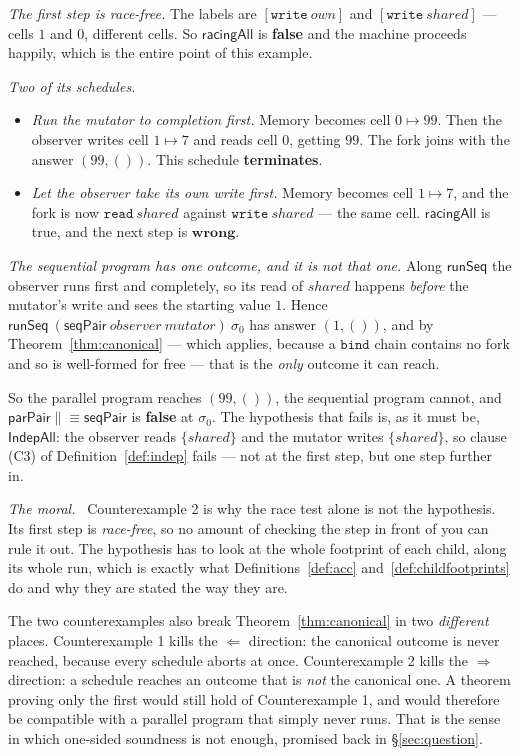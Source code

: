 \documentclass[11pt,a4paper]{article}
\theoremstyle{definition}
\theoremstyle{plain}
\theoremstyle{remark}
\newenvironment{moral}{\par\medskip\noindent\textit{The moral.}\ \ignorespaces}{\par\medskip}
\newcommand{\st}{\sigma}
\newcommand{\runSeq}{\mathsf{runSeq}}
\newcommand{\wrong}{\mathbf{wrong}}
\begin{document}
\emph{The first step is race-free.} The labels are $[\texttt{write}\ \mathit{own}]$ and
$[\texttt{write}\ \mathit{shared}]$ --- cells $1$ and $0$, different cells. So
$\mathsf{racingAll}$ is \textbf{false} and the machine proceeds happily, which is the entire
point of this example.

\emph{Two of its schedules.}
\begin{itemize}[leftmargin=1.6em,itemsep=1pt]
\item \emph{Run the mutator to completion first.} Memory becomes cell $0 \mapsto 99$. Then the
      observer writes cell $1 \mapsto 7$ and reads cell $0$, getting $99$. The fork joins with
      the answer $(99, ())$. This schedule \textbf{terminates}.
\item \emph{Let the observer take its own write first.} Memory becomes cell $1 \mapsto 7$, and
      the fork is now $\texttt{read}\ \mathit{shared}$ against
      $\texttt{write}\ \mathit{shared}$ --- the same cell. $\mathsf{racingAll}$ is true, and
      the next step is $\wrong$.
\end{itemize}

\emph{The sequential program has one outcome, and it is not that one.} Along $\runSeq$ the
observer runs first and completely, so its read of $\mathit{shared}$ happens \emph{before} the
mutator's write and sees the starting value $1$. Hence
$\runSeq\ (\mathsf{seqPair}\ \mathit{observer}\ \mathit{mutator})\ \st_0$ has answer
$(1, ())$, and by Theorem~\ref{thm:canonical} --- which applies, because a $\texttt{bind}$
chain contains no fork and so is well-formed for free --- that is the \emph{only} outcome it
can reach.

So the parallel program reaches $(99,())$, the sequential program cannot, and
$\mathsf{parPair} \mathrel{\|\!\equiv} \mathsf{seqPair}$ is \textbf{false} at $\st_0$. The
hypothesis that fails is, as it must be, $\mathsf{IndepAll}$: the observer reads
$\{\mathit{shared}\}$ and the mutator writes $\{\mathit{shared}\}$, so clause (C3) of
Definition~\ref{def:indep} fails --- not at the first step, but one step further in.

\begin{moral}
Counterexample 2 is why the race test alone is not the hypothesis. Its first step is
\emph{race-free}, so no amount of checking the step in front of you can rule it out. The
hypothesis has to look at the whole footprint of each child, along its whole run, which is
exactly what Definitions~\ref{def:acc} and~\ref{def:childfootprints} do and why they are
stated the way they are.

The two counterexamples also break Theorem~\ref{thm:canonical} in two \emph{different} places.
Counterexample 1 kills the $\Longleftarrow$ direction: the canonical outcome is never reached,
because every schedule aborts at once. Counterexample 2 kills the $\Longrightarrow$ direction:
a schedule reaches an outcome that is \emph{not} the canonical one. A theorem proving only the
first would still hold of Counterexample 1, and would therefore be compatible with a parallel
program that simply never runs. That is the sense in which one-sided soundness is not enough,
promised back in \S\ref{sec:question}.
\end{moral}
\end{document}
